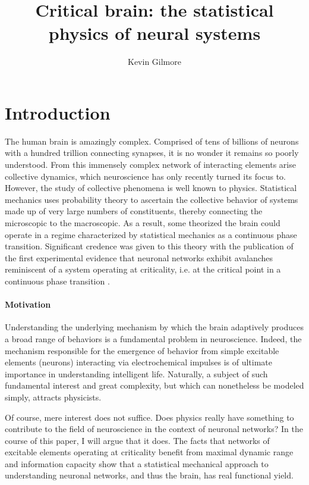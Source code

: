 \documentclass[12pt]{article}
\title{Critical brain: the statistical physics of neural systems}
\author
{Kevin Gilmore}
\begin{document}
 


\baselineskip24pt


\maketitle 

\section*{Introduction}

The human brain is amazingly complex. Comprised of tens of billions of neurons with a hundred trillion connecting synapses, it is no wonder it remains so poorly understood. From this immensely complex network of interacting elements arise collective dynamics, which neuroscience has only recently turned its focus to. However, the study of collective phenomena is well known to physics. Statistical mechanics uses probability theory to ascertain the collective behavior of systems made up of very large numbers of constituents, thereby connecting the microscopic to the macroscopic. As a result, some theorized the brain could operate in a regime characterized by statistical mechanics as a continuous phase transition\cite{Bak1987a}. Significant credence was given to this theory with the publication of the first experimental evidence that neuronal networks exhibit avalanches reminiscent of a system operating at criticality, i.e. at the critical point in a continuous phase transition \cite{Beggs2003b}.

\paragraph*{Motivation} Understanding the underlying mechanism by which the brain adaptively produces a broad range of behaviors is a fundamental problem in neuroscience. Indeed, the mechanism responsible for the emergence of behavior from simple excitable elements (neurons) interacting via electrochemical impulses is of ultimate importance in understanding intelligent life. Naturally, a subject of such fundamental interest and great complexity, but which can nonetheless be modeled simply, attracts physicists. 

Of course, mere interest does not suffice. Does physics really have something to contribute to the field of neuroscience in the context of neuronal networks? In the course of this paper, I will argue that it does. The facts that networks of excitable elements operating at criticality benefit from maximal dynamic range \cite{Kinouchi2006b,Shew2009b} and information capacity\cite{Shew2011a} show that a statistical mechanical approach to understanding neuronal networks, and thus the brain, has real functional yield.
\end{document}
